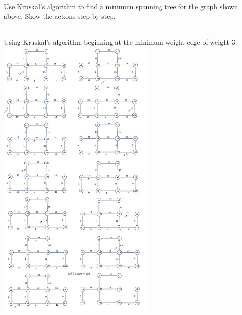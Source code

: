 \documentclass[addpoints,11pt]{exam}
\begin{document}
\begin{questions}
		
		\question[10]
		Use Kruskal's algorithm to find a minimum spanning tree for the graph shown above.  Show the actions step by step.
		\begin{solutionorbox} \\ 
			Using Kruskal's algorithm beginning at the minimum weight edge of weight 3: \\
			\includegraphics[width=0.6\textwidth]{kruskals.jpg}
		\end{solutionorbox}
		
		\ifprintanswers
		\newpage
		\else
		\bigskip
		\fi
		
		
		

\end{questions}
\end{document}
